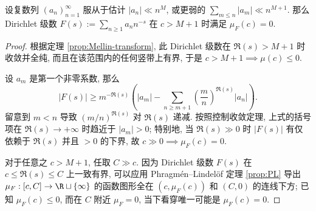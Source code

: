 \begin{proposition}\label{prop:Dirichlet-order}
	设复数列 $(a_n)_{n=1}^\infty$ 服从于估计 $|a_n| \ll n^M$, 或更弱的 $\sum_{m \leq n} |a_m| \ll n^{M+1}$. 那么 Dirichlet 级数 $F(s) := \sum_{n \geq 1} a_n n^{-s}$ 在 $c > M + 1$ 时满足 $\mu_F(c) = 0$.
\end{proposition}
\begin{proof}
	根据定理 \ref{prop:Mellin-transform}, 此 Dirichlet 级数在 $\Re(s) > M + 1$ 时收敛并全纯, 而且在该范围内的任何竖带上有界, 于是 $c > M+1 \implies \mu(c) \leq 0$.
	
	设 $a_m$ 是第一个非零系数, 那么
	\[ |F(s)| \geq m^{-\Re(s)} \left( |a_m| - \sum_{n \geq m + 1} \left( \frac{m}{n} \right)^{\Re(s)} |a_n| \right). \]
	留意到 $m < n$ 导致 $(m/n)^{\Re(s)}$ 对 $\Re(s)$ 递减. 按照控制收敛定理, 上式的括号项在 $\Re(s) \to + \infty$ 时趋近于 $|a_m| > 0$; 特别地, 当 $\Re(s) \gg 0$ 时 $|F(s)|$ 有仅依赖于 $\Re(s)$ 并且 $> 0$ 的下界, 故 $c \gg 0 \implies \mu_F(c) = 0$.
	
	对于任意之 $c > M + 1$, 任取 $C \gg c$. 因为 Dirichlet 级数 $F(s)$ 在 $c \leq \Re(s) \leq C$ 上一致有界, 可以应用 Phragmén--Lindelöf 定理 \ref{prop:PL} 导出 $\mu_F: [c, C] \to \R \sqcup \{\infty\}$ 的函数图形全在 $(c, \mu_F(c))$ 和 $(C, 0)$ 的连线下方; 已知 $\mu_F(c) \leq 0$, 而在 $C$ 附近 $\mu_F = 0$, 当下看穿唯一可能是 $\mu_F(c) = 0$.
\end{proof}

